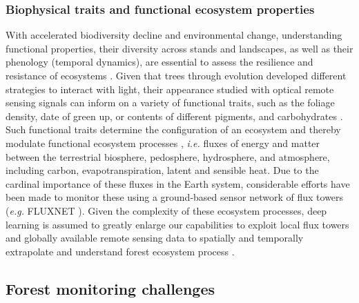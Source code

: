 \documentclass{CUP-JNL-DTM}%
\newcommand{\ELc}[1]{\textcolor{orange}{[\textbf{Eti}: #1]}}
\newcommand{\TKc}[1]{\textcolor{olive}{[\textbf{Tej}: #1]}}
\theoremstyle{definition}
\numberwithin{equation}{section}
\begin{document}
\subsubsection{Biophysical traits and functional ecosystem properties} 
\label{sec:topic_properties}
With accelerated biodiversity decline and environmental change, understanding  functional properties, their diversity across stands and landscapes, as well as their phenology (temporal dynamics), are essential to assess the resilience and resistance of ecosystems \citep{sakschewski_resilience_2016, thompson_forest_2009}. Given that trees through evolution developed different strategies to interact with light, their appearance studied with optical remote sensing signals can inform on a variety of functional traits, such as the foliage density, date of green up, or contents of different pigments, and carbohydrates \citep{schneider_mapping_2017, cherif_spectra_2023}. Such functional traits determine the configuration of an ecosystem and thereby modulate functional ecosystem processes \citep{gomarasca_leaf-level_2023, migliavacca_three_2021}, \textit{i.e.} fluxes of energy and matter between the terrestrial biosphere, pedosphere, hydrosphere, and atmosphere, including carbon, evapotranspiration, latent and sensible heat. Due to the cardinal importance of these fluxes in the Earth system, considerable efforts have been made to monitor these using a ground-based sensor network of flux towers (\textit{e.g.} FLUXNET \cite{baldocchi_fluxnet_2001}). Given the complexity of these ecosystem processes, deep learning is assumed to greatly enlarge our capabilities to exploit local flux towers and globally available remote sensing data to spatially and temporally extrapolate and understand forest ecosystem process \citep{jung_fluxcom_2019, elghawi_hybrid_2023, reichstein_deep_2019, campsvalls_deep_2021}.




\subsection{Forest monitoring challenges}
\label{sec:forest_challenges}
\end{document}
